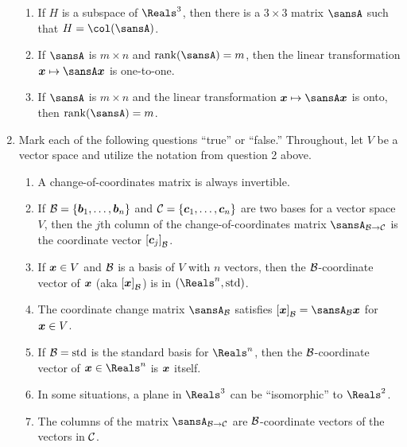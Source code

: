 \documentclass[12pt]{article}
\begin{document}
\begin{enumerate}[topsep=0.125in, itemsep=0.625in]
{\begin{enumerate}[label=(\alph*)]
			\item If $H$ is a subspace of $\Reals^3$, then there is a $3\times 3$ matrix $\sansA$ such that $H=\col(\sansA)$.
			\item If $\sansA$ is $m\times n$ and $\rank(\sansA)=m$, then the linear transformation $\vect{x}\mapsto\sansA\vect{x}$ is one-to-one.
			\item If $\sansA$ is $m\times n$ and the linear transformation $\vect{x}\mapsto\sansA\vect{x}$ is onto, then $\rank(\sansA)=m$.
		\end{enumerate}
		}
		
		\newpage
		
		\item Mark each of the following questions ``true'' or ``false.'' Throughout, let $V$ be a vector space and utilize the notation from question 2 above.
		\begin{enumerate}[label=(\alph*),itemsep=11mm,parsep=3mm]
			\item A change-of-coordinates matrix is always invertible.
			
			\item If $\mathcal{B}=\{\boldsymbol{b}_1,\ldots,\boldsymbol{b}_n\}$ and $\mathcal{C}=\{\boldsymbol{c}_1,\ldots,\boldsymbol{c}_n\}$ are two bases for a vector space $V$, then the $j$th column of the change-of-coordinates matrix $\sansA_{\calB\to\calC}$ is the coordinate vector $\left[\boldsymbol{c}_j\right]_{\mathcal{B}}$.
			
			\item If $\boldsymbol{x}\in V$ and $\mathcal{B}$ is a basis of $V$ with $n$ vectors, then the $\mathcal{B}$-coordinate vector of $\boldsymbol{x}$ (aka $\left[\boldsymbol{x}\right]_{\mathcal{B}}$) is in $(\Reals^n,\std)$.
			
			\item The coordinate change matrix $\sansA_\calB$ satisfies $\left[\vect{x}\right]_\calB=\sansA_\calB\vect{x}$ for $\boldsymbol{x}\in V$.
			
			\item If $\mathcal{B}=\operatorname{std}$ is the standard basis for $\Reals^n$, then the $\mathcal{B}$-coordinate vector of $\vect{x}\in\Reals^n$ is $\boldsymbol{x}$ itself.
			
			\item In some situations, a plane in $\Reals^3$ can be ``isomorphic'' to $\Reals^2$.
			
			
			\item The columns of the matrix $\sansA_{\calB\to\calC}$ are $\mathcal{B}$-coordinate vectors of the vectors in $\mathcal{C}$.
			

\end{enumerate}
\end{enumerate}
\end{document}
